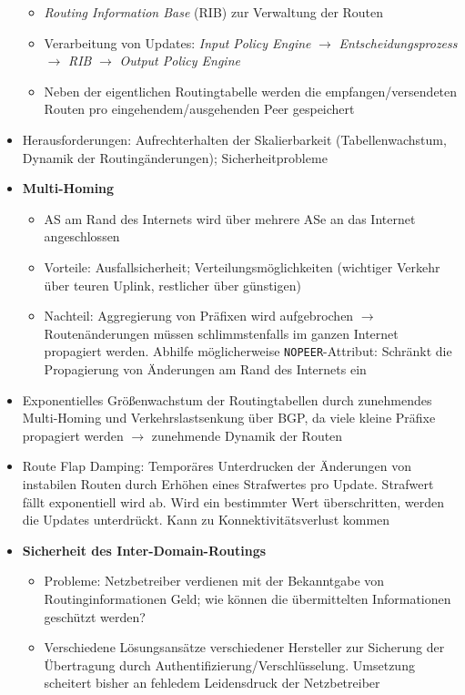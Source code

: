 \begin{itemize}
\begin{itemize}
		\item \textit{Routing Information Base} (RIB) zur Verwaltung der Routen
		\item Verarbeitung von Updates: \textit{Input Policy Engine} \(\rightarrow\) \textit{Entscheidungsprozess} \(\rightarrow\) \textit{RIB} \(\rightarrow\) \textit{Output Policy Engine}
		\item Neben der eigentlichen Routingtabelle werden die empfangen/versendeten Routen pro eingehendem/ausgehenden Peer gespeichert
	\end{itemize}
	\item Herausforderungen: Aufrechterhalten der Skalierbarkeit (Tabellenwachstum, Dynamik der Routingänderungen); Sicherheitprobleme
	\item \textbf{Multi-Homing}
	\begin{itemize}
		\item AS am Rand des Internets wird über mehrere ASe an das Internet angeschlossen
		\item Vorteile: Ausfallsicherheit; Verteilungsmöglichkeiten (wichtiger Verkehr über teuren Uplink, restlicher über günstigen)
		\item Nachteil: Aggregierung von Präfixen wird aufgebrochen \(\rightarrow\) Routenänderungen müssen schlimmstenfalls im ganzen Internet propagiert werden. Abhilfe möglicherweise \texttt{NOPEER}-Attribut: Schränkt die Propagierung von Änderungen am Rand des Internets ein
	\end{itemize}
	\item Exponentielles Größenwachstum der Routingtabellen durch zunehmendes Multi-Homing und Verkehrslastsenkung über BGP, da viele kleine Präfixe propagiert werden \(\rightarrow\) zunehmende Dynamik der Routen
	\item Route Flap Damping: Temporäres Unterdrucken der Änderungen von instabilen Routen durch Erhöhen eines Strafwertes pro Update. Strafwert fällt exponentiell wird ab. Wird ein bestimmter Wert überschritten, werden die Updates unterdrückt. Kann zu Konnektivitätsverlust kommen
	\item \textbf{Sicherheit des Inter-Domain-Routings}
	\begin{itemize}
		\item Probleme: Netzbetreiber verdienen mit der Bekanntgabe von Routinginformationen Geld; wie können die übermittelten Informationen geschützt werden?
		\item Verschiedene Lösungsansätze verschiedener Hersteller zur Sicherung der Übertragung durch Authentifizierung/Verschlüsselung. Umsetzung scheitert bisher an fehledem Leidensdruck der Netzbetreiber

\end{itemize}
\end{itemize}
